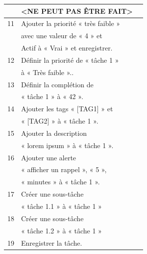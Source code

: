 \documentclass[letterpaper, oneside, 12pt, these, creativecommons]{thETS}
\begin{document}
\begin{table}
\begin{tabular}{|l|l|l|}
				& <NE PEUT PAS ÊTRE FAIT>	&								\\ \hline
		11		& Ajouter la priorité « très faible »&								\\
				& avec une valeur de « 4 » et 	&								\\
				& Actif à « Vrai » et enregistrer.	&								\\ \hline
		12		& Définir la priorité de  « tâche 1 »&								\\
				&  à « Très faible »..		&								\\ \hline
		13		& Définir la complétion de 		&								\\
				& « tâche 1 » à « 42 ».		&								\\ \hline
		14		& Ajouter les tags « [TAG1] » et 	&								\\
				& « [TAG2] » à « tâche 1 ».	&								\\ \hline
		15		& Ajouter la description 		&								\\
				& « lorem ipsum » à « tâche 1 ».	&								\\ \hline
		16		& Ajouter une alerte 	 	&								\\
				& « afficher un rappel », « 5 »,	& 								\\
				&  « minutes » à « tâche 1 ».	&								\\ \hline
		17		& Créer une sous-tâche		&								\\
				&  « tâche 1.1 » à « tâche 1 »	&								\\ \hline
		18		& Créer une sous-tâche		&								\\
				&  « tâche 1.2 » à « tâche 1 »	&								\\ \hline
		19		& Enregistrer la tâche.		& 								\\ \hline
	\end{tabular}
\end{table}

\newpage
\end{document}
